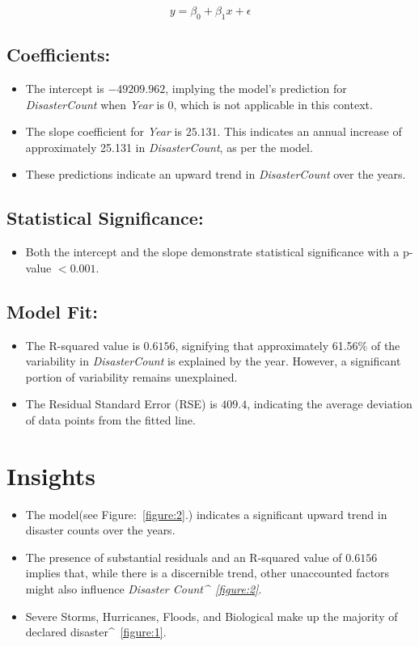 \documentclass[12pt]{report}\usepackage[]{graphicx}\usepackage[]{xcolor}
\begin{document}
\begin{equation}
    y = \beta_0 + \beta_1x + \epsilon
\end{equation}
\subsection*{Coefficients:}
\begin{itemize}
    \item The intercept is $-49209.962$, implying the model's prediction for \textit{DisasterCount} when \textit{Year} is 0, which is not applicable in this context.
    \item The slope coefficient for \textit{Year} is $25.131$. This indicates an annual increase of approximately 25.131 in \textit{DisasterCount}, as per the model.
    \item These predictions indicate an upward trend in \textit{DisasterCount} over the years.
\end{itemize}
\subsection*{Statistical Significance:}
\begin{itemize}
  \item Both the intercept and the slope demonstrate statistical significance with a p-value $< 0.001$.
\end{itemize}
\subsection*{Model Fit:}
\begin{itemize}
    \item The R-squared value is $0.6156$, signifying that approximately 61.56\% of the variability in \textit{DisasterCount} is explained by the year. However, a significant portion of variability remains unexplained.
    \item The Residual Standard Error (RSE) is $409.4$, indicating the average deviation of data points from the fitted line.
\end{itemize}
\section{Insights}
\begin{itemize}
      \item The model(see Figure:\Figure~\ref{figure:2}.) indicates a significant upward trend in disaster counts over the years.

      \item The presence of substantial residuals and an R-squared value of $0.6156$ implies that, while there is a discernible trend, other unaccounted factors might also influence \textit{Disaster Count^\Figure~\ref{figure:2}}.

      \item Severe Storms, Hurricanes, Floods, and Biological make up the majority of declared disaster^\Figure~\ref{figure:1}.

\end{itemize}
\end{document}
